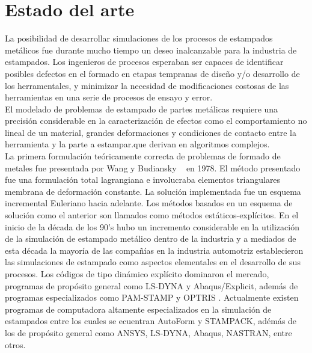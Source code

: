 

\section{Estado del arte}

La posibilidad de desarrollar simulaciones de los procesos de estampados metálicos fue durante mucho tiempo 
un deseo inalcanzable para la industria de estampados. Los ingenieros de procesos esperaban ser capaces de 
identificar posibles defectos en el formado en etapas tempranas de diseño y/o desarrollo de los herramentales, 
y minimizar la necesidad de modificaciones costosas de las herramientas en una serie de procesos de ensayo y error. \\

El modelado de problemas de estampado de partes metálicas requiere una precisión considerable en la caracterización 
de efectos como el comportamiento no lineal de un material, grandes deformaciones y condiciones de contacto entre la
herramienta y la parte a estampar.que derivan  en algoritmos complejos.\cite{banabic2000}\\

La primera formulación teóricamente correcta de problemas de formado de metales fue presentada por 
Wang y Budiansky ~\cite{wang1978} en 1978. El método presentado fue una formulación total lagrangiana 
e involucraba elementos triangulares membrana de deformación constante. La solución implementada fue 
un esquema incremental Euleriano hacia adelante. Los métodos basados en un 
esquema de solución como el anterior son llamados como métodos estáticos-explícitos.
En el inicio de la década de los 90's hubo un incremento considerable en la utilización de la simulación de estampado 
metálico dentro de la industria y a mediados de esta década la mayoría de las compañías en la industria automotriz 
establecieron las simulaciones de estampado como aspectos elementales en el desarrollo de sus procesos.
Los códigos de tipo dinámico explícito dominaron el mercado, programas de propósito general como LS-DYNA y 
Abaqus/Explicit, además de programas especializados como PAM-STAMP y OPTRIS \cite{banabic2000}.
Actualmente existen programas de computadora altamente especializados en la simulación de estampados entre los 
cuales se ecuentran AutoForm y STAMPACK, adémás de los de propósito general como ANSYS, LS-DYNA, Abaqus, 
NASTRAN, entre otros.\\

